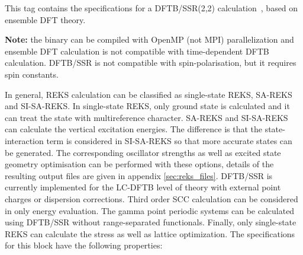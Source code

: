 This tag contains the specifications for a DFTB/SSR(2,2) calculation~\cite{Lee_JCTC_2019}, based on ensemble DFT theory.

\textbf{Note:} the \dftbp{} binary can be compiled with OpenMP (not MPI) parallelization
and ensemble DFT calculation is not compatible with time-dependent DFTB calculation.
DFTB/SSR is not compatible with spin-polarisation, but it requires spin constants.

In general, REKS calculation can be classified as single-state REKS, SA-REKS and SI-SA-REKS.
In single-state REKS, only ground state is calculated and it can treat the state with multireference
character. SA-REKS and SI-SA-REKS can calculate the vertical excitation energies. The difference
is that the state-interaction term is considered in SI-SA-REKS so that more accurate states can
be generated. The corresponding oscillator strengths as well as excited state geometry optimisation
can be performed with these options, details of the resulting output files are given in appendix
\ref{sec:reks_files}. DFTB/SSR is currently implemented for the LC-DFTB level of theory with external
point charges or dispersion corrections. Third order SCC calculation can be considered in only
energy evaluation. The gamma point periodic systems can be calculated using DFTB/SSR without
range-separated functionals. Finally, only single-state REKS can calculate the stress as well as
lattice optimization. The specifications for this block have the following properties:

